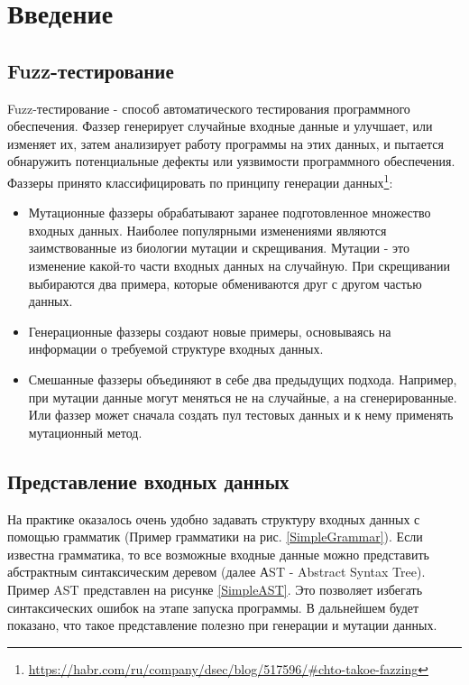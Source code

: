 \documentclass[a4paper]{article}
\begin{document}
\newpage
\section{Введение}

\subsection{Fuzz-тестирование}
\indent

Fuzz-тестирование - способ автоматического тестирования программного обеспечения. Фаззер генерирует случайные входные данные и улучшает, или изменяет их, затем анализирует работу программы на этих данных, и пытается обнаружить потенциальные дефекты или уязвимости программного обеспечения. Фаззеры принято классифицировать по принципу генерации данных\footnote{\href{https://habr.com/ru/company/dsec/blog/517596/\#chto-takoe-fazzing}{https://habr.com/ru/company/dsec/blog/517596/\#chto-takoe-fazzing}}:

\begin{itemize}
\item Мутационные фаззеры обрабатывают заранее подготовленное множество входных данных. Наиболее популярными изменениями являются заимствованные из биологии мутации и скрещивания. Мутации - это изменение какой-то части входных данных на случайную. При скрещивании выбираются два примера, которые обмениваются друг с другом частью данных.
\item Генерационные фаззеры создают новые примеры, основываясь на информации о требуемой структуре входных данных. 
\item Смешанные фаззеры объединяют в себе два предыдущих подхода. Например, при мутации данные могут меняться не на случайные, а на сгенерированные. Или фаззер может сначала создать пул тестовых данных и к нему применять мутационный метод. 
\end{itemize}

\subsection{Представление входных данных}
\indent

На практике оказалось очень удобно задавать структуру входных данных с помощью грамматик (Пример грамматики на рис. \ref{SimpleGrammar}). Если известна грамматика, то все возможные входные данные можно представить абстрактным синтаксическим деревом (далее АST - Abstract Syntax Tree). Пример AST представлен на рисунке \ref{SimpleAST}. Это позволяет избегать синтаксических ошибок на этапе запуска программы. В дальнейшем будет показано, что такое представление полезно при генерации и мутации данных.
\end{document}
